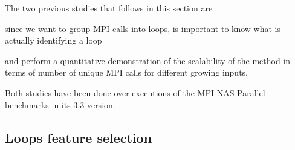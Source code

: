 The two previous studies that follows in this section are 
\begin{enumerate*}[label=\roman*)]
  \item since we want to group MPI calls into loops, is important to know what
    is actually identifying a loop
  \item and perform a quantitative demonstration of the scalability of the
    method in terms of number of unique MPI calls for different growing inputs.
\end{enumerate*}
Both studies have been done over executions of the MPI NAS Parallel benchmarks 
in its 3.3 version.

\subsection{Loops feature selection}\label{ss:loops_characterzation}

